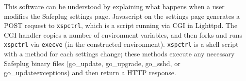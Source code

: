 \documentclass[letterpaper,twocolumn,10pt]{article}
\begin{document}
%

This software can be understood by explaining what happens when a user modifies the Safeplug settings page.  Javascript on the settings page generates a POST request to {\tt xspctrl}, which is a script running via CGI in Lighttpd. The CGI handler copies a number of environment variables, and then forks and runs {\tt xspctrl} via {\tt execve} (in the constructed environment). {\tt xspctrl} is a shell script with a method for each settings change; these methods execute any necessary Safeplug binary files (go\_update, go\_upgrade, go\_sshd, or go\_updateexceptions) and then return a HTTP response.


    
\end{document}
